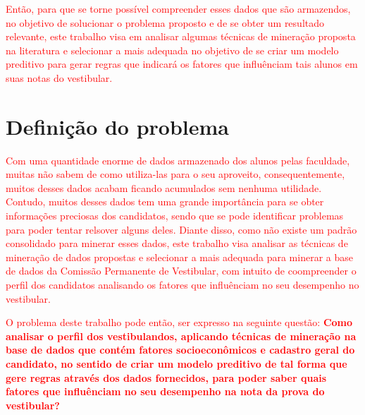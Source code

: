 \textcolor{red}{Então, para que se torne possível compreender esses dados que são armazendos, no objetivo de solucionar o problema proposto e de se obter um resultado relevante, este trabalho visa em analisar algumas técnicas de mineração proposta na literatura e selecionar a mais adequada no objetivo de se criar um modelo preditivo para gerar regras que indicará os fatores que influênciam tais alunos em suas notas do vestibular.}


\section{Definição do problema}

\par
\textcolor{red}{Com uma quantidade enorme de dados armazenado dos alunos pelas faculdade, muitas não sabem de como utiliza-las para o seu aproveito, consequentemente, muitos desses dados acabam ficando acumulados sem nenhuma utilidade. Contudo, muitos desses dados tem uma grande importância para se obter informações preciosas dos candidatos, sendo que se pode identificar problemas para poder tentar relsover alguns deles. Diante disso, como não existe um padrão consolidado para minerar esses dados, este trabalho visa analisar as técnicas de mineração de dados propostas e selecionar a mais adequada para minerar a base de dados da Comissão Permanente de Vestibular, com intuito de coompreender o perfil dos candidatos analisando os fatores que influênciam no seu desempenho no vestibular.}

\par
\textcolor{red}{O problema deste trabalho pode então, ser expresso na seguinte questão: \textbf{Como analisar o perfil dos vestibulandos, aplicando técnicas de mineração na base de dados que contém fatores socioeconômicos e cadastro geral do candidato, no sentido de criar um modelo preditivo de tal forma que gere regras através dos dados fornecidos, para poder saber quais fatores que influênciam no seu desempenho na nota  da prova do vestibular? }}




